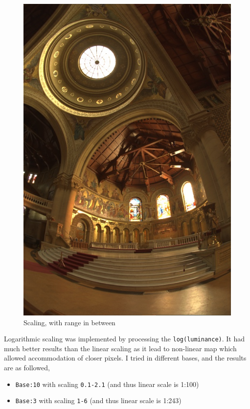 \documentclass{article}
\begin{document}
\begin{figure}[!htb]
      \includegraphics[scale=.27]{./data/1/linscl/md.jpg}
      \caption{Scaling, with range in between}
    \endminipage
    \end{figure}
    \pagebreak
    Logarithmic scaling was implemented by processing the \texttt{log(luminance)}. It had much better results than the linear scaling as it lead to non-linear map which allowed accommodation of closer pixels. I tried in different bases, and the results are as followed,
    \begin{itemize}
        \item \texttt{Base:10} with scaling \texttt{0.1-2.1} (and thus linear scale is 1:100)
        \item \texttt{Base:3} with scaling \texttt{1-6} (and thus linear scale is 1:243)
    \end{itemize}
    
\end{document}
